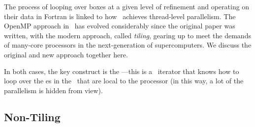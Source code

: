 The process of looping over boxes at a given level of refinement and
operating on their data in Fortran is linked to how \castro\ achieves
thread-level parallelism.  The OpenMP approach in \castro\ has evolved
considerably since the original paper was written, with the modern
approach, called {\em tiling}, gearing up to meet the demands of
many-core processors in the next-generation of supercomputers.  We
discuss the original and new approach together here.

In both cases, the key construct is the \code{\mfiter}---this is a
\cpp\ iterator that knows how to loop over the \farraybox es in the
\multifab\ that are local to the processor (in this way, a lot of the
parallelism is hidden from view).

\subsection{Non-Tiling \mfiter}

